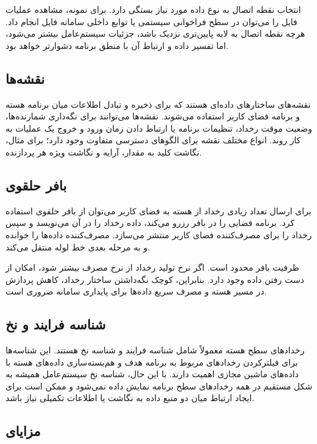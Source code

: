 انتخاب نقطه اتصال به نوع داده مورد نیاز بستگی دارد. برای نمونه، مشاهده عملیات
فایل را می‌توان در سطح فراخوانی سیستمی یا توابع داخلی سامانه فایل انجام داد.
هرچه نقطه اتصال به لایه پایین‌تری نزدیک باشد، جزئیات سیستم‌عامل بیشتر می‌شود،
اما تفسیر داده و ارتباط آن با منطق برنامه دشوارتر خواهد بود.

\subsection{نقشه‌ها}

نقشه‌های  ساختارهای داده‌ای هستند که برای ذخیره
و تبادل اطلاعات میان برنامه هسته و برنامه فضای کاربر استفاده می‌شوند. نقشه‌ها
می‌توانند برای نگه‌داری شمارنده‌ها، وضعیت موقت رخداد، تنظیمات برنامه یا ارتباط
دادن زمان ورود و خروج یک عملیات به کار روند. انواع مختلف نقشه برای الگوهای
دسترسی متفاوت وجود دارد؛ برای مثال، نگاشت کلید به مقدار، آرایه و نگاشت ویژه هر
پردازنده.

\subsection{بافر حلقوی}

برای ارسال تعداد زیادی رخداد از هسته به فضای کاربر می‌توان از بافر حلقوی
 استفاده کرد. برنامه  فضایی را در بافر رزرو
می‌کند، داده رخداد را در آن می‌نویسد و سپس رخداد را برای مصرف‌کننده فضای کاربر
منتشر می‌سازد. مصرف‌کننده داده‌ها را خوانده و به مرحله بعدی خط لوله منتقل
می‌کند.

ظرفیت بافر محدود است. اگر نرخ تولید رخداد از نرخ مصرف بیشتر شود، امکان از دست
رفتن داده وجود دارد. بنابراین، کوچک نگه‌داشتن ساختار رخداد، کاهش پردازش در مسیر
هسته و مصرف سریع داده‌ها برای پایداری سامانه ضروری است.

\subsection{شناسه فرایند و نخ}

رخدادهای سطح هسته معمولاً شامل شناسه فرایند و شناسه نخ هستند. این شناسه‌ها برای
فیلترکردن رخدادهای مربوط به برنامه هدف و هم‌بسته‌سازی داده‌های هسته با داده‌های
ماشین مجازی اهمیت دارند. با این حال، شناسه نخ سیستم‌عامل همیشه به شکل مستقیم در
همه رخدادهای سطح برنامه نمایش داده نمی‌شود و ممکن است برای ایجاد ارتباط میان دو
منبع داده به نگاشت یا اطلاعات تکمیلی نیاز باشد.

\subsection{مزایای }

